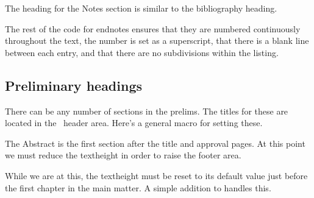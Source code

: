     The heading for the Notes section is similar to the bibliography
heading.
\begin{lcode}
\renewcommand*{\notesname}{NOTES}
\renewcommand*{\notedivision}{%
  \AsuSpacing
  \chapter*{\notesname}
  \addcontentsline{toc}{chapter}{\notesname}
  \SingleSpacing}
\end{lcode}

    The rest of the code for endnotes ensures that they are 
numbered
continuously throughout the text, the number is set as a superscript, that
there is a blank line between each entry, and that there are no subdivisions
within the listing.
\begin{lcode}
\continuousnotenums 
\renewcommand*{\notenuminnotes}[1]{\textsuperscript{#1}\space}
\renewcommand{\noteinnotes}[1]{#1\\}
\renewcommand*{\pagenotesubhead}[3]{}%
\end{lcode}

\subsection{Preliminary headings}

    There can be any number of sections in the prelims. The
titles for these are located in the \ltx\ header area. Here's a general 
macro for setting these.

\begin{lcode}
\newcommand*{\pretoctitle}[1]{{\clearpage\centering 
  \vspace*{-\topfiddle}#1\par}}
\newcommand{\asuacknowledgements}{\pretoctitle{ACKNOWLEDGEMENTS}}

\end{lcode}

    The Abstract is the
first section after the title and approval pages. At this point we must reduce
the textheight in order to raise the footer area.
\begin{lcode}
\newcommand{\asuabstract}{%
  \addtotextheight{-\botfiddle}%
  \pretoctitle{ABSTRACT}}
\end{lcode}
    While we are at this, the textheight must be reset to its default value
just before the first chapter in the main matter. A simple addition to
\cmd{\mainmatter} handles this.
\begin{lcode}
\addtodef{\mainmatter}{\addtotextheight{\botfiddle}{}

\end{lcode}

